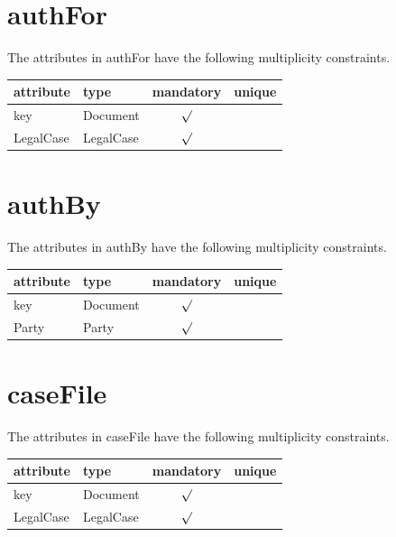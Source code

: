 \documentclass[10pt,a4paper]{report}              %
\theoremstyle{plain}\theorembodyfont{\rmfamily}\newtheorem{definition}{Definition}[section]
\theoremstyle{plain}\theorembodyfont{\rmfamily}\newtheorem{designrule}[definition]{Requirement}
\begin{document}
\section{authFor}

\label{sct:plug authFor}

The attributes in authFor have the following multiplicity constraints. 

\begin{center}
\begin{tabular}{llcc}
attribute & type & mandatory & unique\\
\hline
key  & Document & $\surd$ & \\
LegalCase & LegalCase & $\surd$ & \\
\end{tabular}
\end{center}

\section{authBy}

\label{sct:plug authBy}

The attributes in authBy have the following multiplicity constraints. 

\begin{center}
\begin{tabular}{llcc}
attribute & type & mandatory & unique\\
\hline
key  & Document & $\surd$ & \\
Party & Party & $\surd$ & \\
\end{tabular}
\end{center}

\section{caseFile}

\label{sct:plug caseFile}

The attributes in caseFile have the following multiplicity constraints. 

\begin{center}
\begin{tabular}{llcc}
attribute & type & mandatory & unique\\
\hline
key  & Document & $\surd$ & \\
LegalCase & LegalCase & $\surd$ & \\
\end{tabular}
\end{center}
\end{document}
